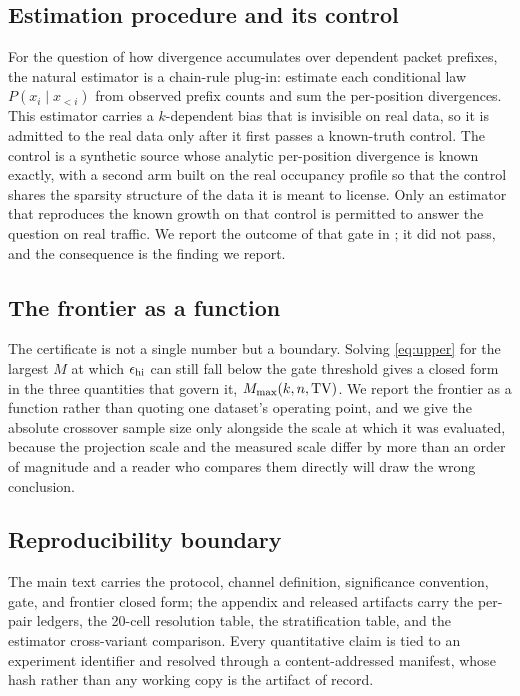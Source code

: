 \subsection{Estimation procedure and its control}
\label{sec:design/estimator}

For the question of how divergence accumulates over dependent packet prefixes,
the natural estimator is a chain-rule plug-in: estimate each conditional law
$P(x_i \mid x_{<i})$ from observed prefix counts and sum the per-position
divergences. This estimator carries a $k$-dependent bias that is invisible on
real data, so it is admitted to the real data only after it first passes a
known-truth control. The control is a synthetic source whose analytic
per-position divergence is known exactly, with a second arm built on the real
occupancy profile so that the control shares the sparsity structure of the data
it is meant to license. Only an estimator that reproduces the known growth on
that control is permitted to answer the question on real traffic. We report the
outcome of that gate in ; it did not pass, and the
consequence is the finding we report.

\subsection{The frontier as a function}
\label{sec:design/frontier}

The certificate is not a single number but a boundary. Solving
\eqref{eq:upper} for the largest $M$ at which $\epsilon_{\mathrm{hi}}$ can still fall below the
gate threshold gives a closed form in the three quantities that govern it,
$M_{\max}(k, n, \mathrm{TV})$. We report the frontier as a function rather than quoting
one dataset's operating point, and we give the absolute crossover sample size
only alongside the scale at which it was evaluated, because the projection scale
and the measured scale differ by more than an order of magnitude and a reader
who compares them directly will draw the wrong conclusion.

\subsection{Reproducibility boundary}
\label{sec:design/repro}

The main text carries the protocol, channel definition, significance
convention, gate, and frontier closed form; the appendix and released artifacts
carry the per-pair ledgers, the 20-cell resolution table, the stratification
table, and the estimator cross-variant comparison. Every quantitative claim is
tied to an experiment identifier and resolved through a content-addressed
manifest, whose hash rather than any working copy is the artifact of record.

